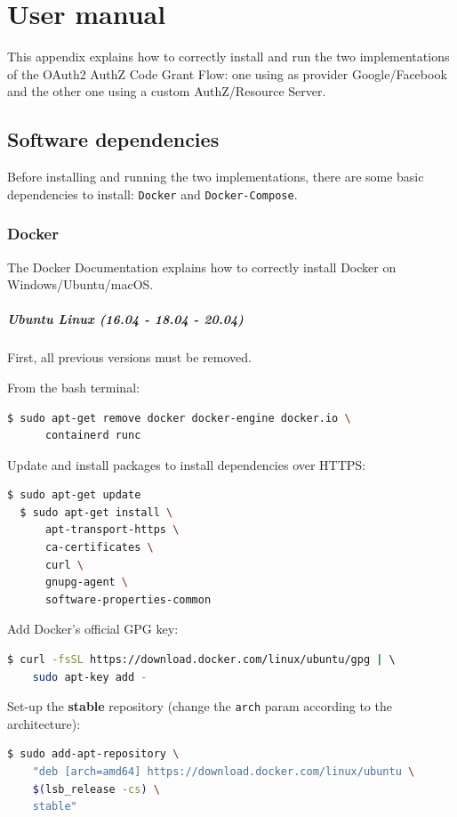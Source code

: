 \appendix
\chapter{User manual}
This appendix explains how to correctly install and run the two implementations of the OAuth2 AuthZ Code Grant Flow: one using as provider Google/Facebook and the other one using a custom AuthZ/Resource Server.

\minitoc

\section{Software dependencies}
\label{appa}
Before installing and running the two implementations, there are some basic dependencies to install: \texttt{Docker} and \texttt{Docker-Compose}.

\subsection{Docker}
\label{ublin}
The Docker Documentation \cite{docker} explains how to correctly install Docker on Windows/Ubuntu/macOS.

\paragraph{Ubuntu Linux (16.04 - 18.04 - 20.04)} First, all previous versions must be removed. 

\noindent From the bash terminal:
\begin{lstlisting}[language=bash]
  $ sudo apt-get remove docker docker-engine docker.io \
      containerd runc
\end{lstlisting}

\noindent Update and install packages to install dependencies over HTTPS:
\begin{lstlisting}[language=bash]
  $ sudo apt-get update
  $ sudo apt-get install \
      apt-transport-https \
      ca-certificates \
      curl \
      gnupg-agent \
      software-properties-common
\end{lstlisting}

\noindent Add Docker’s official GPG key:
\begin{lstlisting}[language=bash, showstringspaces=false, basicstyle=\ttfamily]
  $ curl -fsSL https://download.docker.com/linux/ubuntu/gpg | \ 
    sudo apt-key add -
\end{lstlisting}

\noindent Set-up the \textbf{stable} repository (change the \texttt{arch} param according to the architecture):
\begin{lstlisting}[language=bash, showstringspaces=false, basicstyle=\ttfamily]
  $ sudo add-apt-repository \
    "deb [arch=amd64] https://download.docker.com/linux/ubuntu \
    $(lsb_release -cs) \
    stable"
\end{lstlisting}

